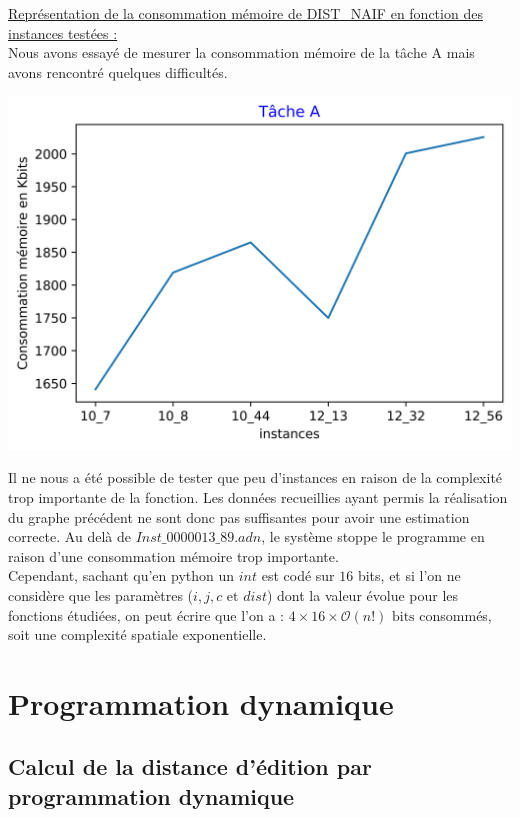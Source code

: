 \documentclass[12pt, a4paper]{report}
\begin{document}
\underline{Représentation de la consommation mémoire de DIST\_NAIF en fonction des instances testées :}\\
Nous avons essayé de mesurer la consommation mémoire de la tâche A mais avons rencontré quelques difficultés.
\begin{center}
\includegraphics[scale=0.75]{TA2.png}
\end{center}
Il ne nous a été possible de tester que peu d'instances en raison de la complexité trop importante de la fonction. Les données recueillies ayant permis la réalisation du graphe précédent ne sont donc pas suffisantes pour avoir une estimation correcte. Au delà de $Inst\_0000013\_89.adn$, le système stoppe le programme en raison d'une consommation mémoire trop importante.\\
Cependant, sachant qu'en python un $int$ est codé sur $16$ bits, et si l'on ne considère que les paramètres ($i,j,c \text{ et } dist$) dont la valeur évolue pour les fonctions étudiées, on peut écrire que l'on a : $4\times 16 \times \mathcal{O}(n!) \text{ bits}$ consommés, soit une complexité spatiale exponentielle. 


\section{Programmation dynamique}
\subsection{Calcul de la distance d'édition par programmation dynamique}
\end{document}
